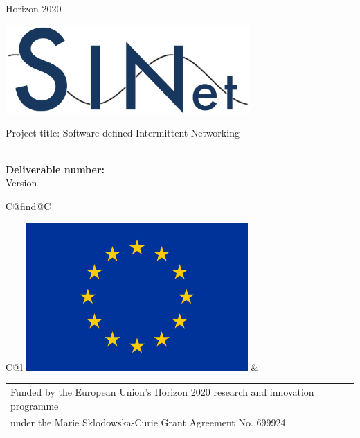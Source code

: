 \begin{center}
Horizon 2020
\vspace{2cm}

  \begin{center}



  \includegraphics[width=0.7\textwidth]{images/SINet}
  \vspace{2mm}

  \end{center}
  \vspace{1cm}
  {\Large Project title: Software-defined Intermittent Networking\\}
  \vspace{2cm}
  
  \begin{spacing}{2.5}
    \textbf{\Huge \DelTitle}\\\vspace{10mm}
    \textbf{\Large Deliverable number: \DelNumber} \\\vspace{10mm} 
    {\large Version \DelVersion}
  \end{spacing}
  
  \vspace*{\fill}

  \newcommand\undefcolumntype[1]{\expandafter\let\csname NC@find@#1\endcsname\relax}
  \newcommand\forcenewcolumntype[1]{\undefcolumntype{#1}\newcolumntype{#1}}
  \forcenewcolumntype{C}{ >{\arraybackslash} m{3cm} }


  \begin{tabular}{C@{\hspace*{0cm}}l}
    \includegraphics[scale=0.2]{images/logos/EU_Flag_320_213} &
    \begin{tabular}{l}
    {Funded by the European Union’s Horizon 2020 research and innovation programme}\\
    {under the Marie Sklodowska-Curie Grant Agreement No. 699924}\\
    \end{tabular}
  \end{tabular}
\end{center}

